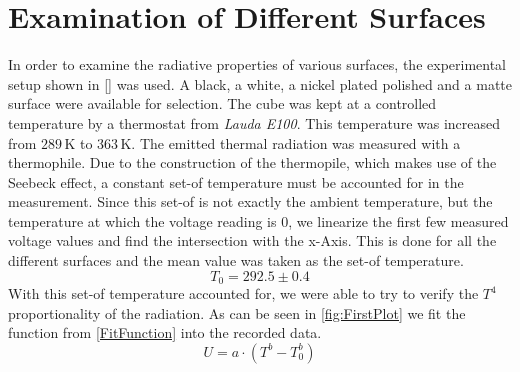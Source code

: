 \documentclass[a4paper,10pt,twocolumn]{article}
\begin{document}
    
    
    
    \section{Examination of Different Surfaces}\label{sec:ExaminationOfDifferentSurfaces}
    In order to examine the radiative properties of various surfaces, the experimental setup shown in \autoref{} was used.
    A black, a white, a nickel plated polished and a matte surface were available for selection. 
    The cube was kept at a controlled temperature by a thermostat from \textit{Lauda E100}.
    This temperature was increased from $ 289\,$K to $363\,$K.
    The emitted thermal radiation was measured with a thermophile.
    Due to the construction of the thermopile, which makes use of the Seebeck effect, a constant set-of temperature must be accounted for in the measurement.
    Since this set-of is not exactly the ambient temperature, but the temperature at which the voltage reading is $0$, we linearize the first few measured voltage values 
    and find the intersection with the x-Axis.
    This is done for all the different surfaces and the mean value was taken as the set-of temperature.
    \begin{equation}\label{SetofTemp}
        T_0 = 292.5 \pm 0.4
    \end{equation}
    With this set-of temperature accounted for, we were able to try to verify the $T^4$ proportionality of the radiation.
    As can be seen in \autoref{fig:FirstPlot} we fit the function from \autoref{FitFunction} into the recorded data.
    \begin{equation}\label{FitFunction}
        U = a\cdot (T^b - T_0^b)
    \end{equation}
    
\end{document}
